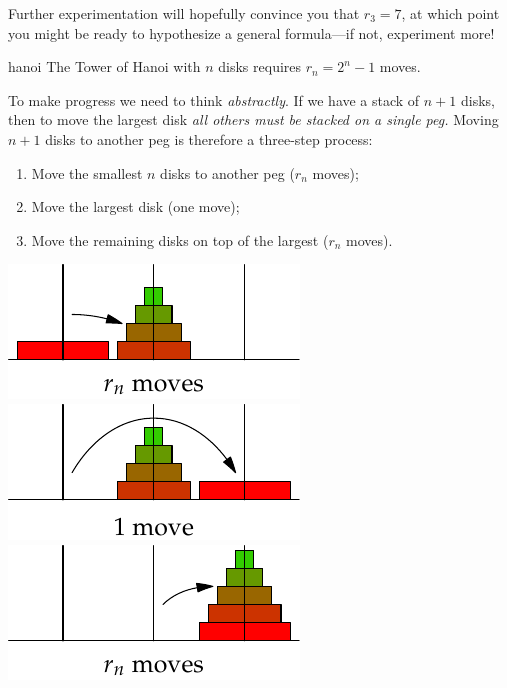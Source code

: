 Further experimentation will hopefully convince you that $r_3=7$, at which point you might be ready to hypothesize a general formula---if not, experiment more!

\begin{conj}{}{hanoi}
	The Tower of Hanoi with $n$ disks requires $r_n=2^n-1$ moves.
\end{conj}

To make progress we need to think \emph{abstractly}. If we have a stack of $n+1$ disks, then to move the largest disk \emph{all others must be stacked on a single peg.} Moving $n+1$ disks to another peg is therefore a three-step process:
\begin{enumerate}\itemsep0pt
  \item Move the smallest $n$ disks to another peg ($r_n$ moves);
  \item Move the largest disk (one move);
  \item Move the remaining disks on top of the largest ($r_n$ moves).
\end{enumerate}
\begin{center}
	\href{http://www.math.uci.edu/~ndonalds/math13/induction-01-hanoi.html}{
		\includegraphics{induction-04-hanoirn3}\quad
		\includegraphics{induction-04-hanoirn4}\quad
		\includegraphics{induction-04-hanoirn5}
	}
\end{center}


